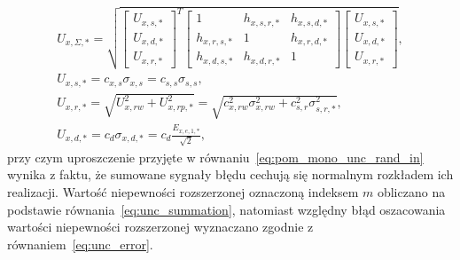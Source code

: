 \begin{gather}
U_{x,\Sigma,*} = \sqrt{
\begin{bmatrix}
U_{x,s,*} \\ U_{x,d,*} \\ U_{x,r,*}
\end{bmatrix}^{T}
\begin{bmatrix}
1           & h_{x,s,r,*} & h_{x,s,d,*} \\
h_{x,r,s,*} &           1 & h_{x,r,d,*} \\
h_{x,d,s,*} & h_{x,d,r,*} &           1
\end{bmatrix}
\begin{bmatrix}
U_{x,s,*} \\ U_{x,d,*} \\ U_{x,r,*}
\end{bmatrix}}
\label{eq:pom_uncx_sum_all}, \\
U_{x,s,*} = c_{x,s} \sigma_{x,s} = c_{s,s} \sigma_{s,s} \label{eq:pom_mono_unc_stat_in}, \\
U_{x,r,*} = \sqrt{U_{x,rw}^{2} + U_{x,rp,*}^{2}} = \sqrt{c_{x,rw}^{2} \sigma_{x,rw}^2 + c_{s,r}^{2} \sigma_{s,r,*}^{2}} \label{eq:pom_mono_unc_rand_in}, \\
U_{x,d,*} = c_{d} \sigma_{x,d,*} = c_{d} \frac{E_{x,e,1,*}}{\sqrt{2}} \label{eq:pom_mono_unc_dyn_all},
\end{gather}
przy czym uproszczenie przyjęte w równaniu~\eqref{eq:pom_mono_unc_rand_in} wynika z faktu, że sumowane sygnały błędu cechują się normalnym rozkładem ich realizacji. Wartość niepewności rozszerzonej oznaczoną indeksem $m$ obliczano na podstawie równania~\eqref{eq:unc_summation}, natomiast względny błąd oszacowania wartości niepewności rozszerzonej wyznaczano zgodnie z równaniem~\eqref{eq:unc_error}.

